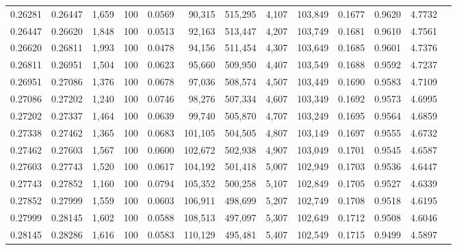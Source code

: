 \begin{tabular}{rrrrrrrrrrrrr}
0.26281 & 0.26447 & 1,659 & 100 &                                     0.0569 &  90,315 & 515,295 &   4,107 & 103,849 & 0.1677 & 0.9620 & 4.7732 \\
0.26447 & 0.26620 & 1,848 & 100 &                                     0.0513 &  92,163 & 513,447 &   4,207 & 103,749 & 0.1681 & 0.9610 & 4.7561 \\
0.26620 & 0.26811 & 1,993 & 100 &                                     0.0478 &  94,156 & 511,454 &   4,307 & 103,649 & 0.1685 & 0.9601 & 4.7376 \\
0.26811 & 0.26951 & 1,504 & 100 &                                     0.0623 &  95,660 & 509,950 &   4,407 & 103,549 & 0.1688 & 0.9592 & 4.7237 \\
0.26951 & 0.27086 & 1,376 & 100 &                                     0.0678 &  97,036 & 508,574 &   4,507 & 103,449 & 0.1690 & 0.9583 & 4.7109 \\
0.27086 & 0.27202 & 1,240 & 100 &                                     0.0746 &  98,276 & 507,334 &   4,607 & 103,349 & 0.1692 & 0.9573 & 4.6995 \\
0.27202 & 0.27337 & 1,464 & 100 &                                     0.0639 &  99,740 & 505,870 &   4,707 & 103,249 & 0.1695 & 0.9564 & 4.6859 \\
0.27338 & 0.27462 & 1,365 & 100 &                                     0.0683 & 101,105 & 504,505 &   4,807 & 103,149 & 0.1697 & 0.9555 & 4.6732 \\
0.27462 & 0.27603 & 1,567 & 100 &                                     0.0600 & 102,672 & 502,938 &   4,907 & 103,049 & 0.1701 & 0.9545 & 4.6587 \\
0.27603 & 0.27743 & 1,520 & 100 &                                     0.0617 & 104,192 & 501,418 &   5,007 & 102,949 & 0.1703 & 0.9536 & 4.6447 \\
0.27743 & 0.27852 & 1,160 & 100 &                                     0.0794 & 105,352 & 500,258 &   5,107 & 102,849 & 0.1705 & 0.9527 & 4.6339 \\
0.27852 & 0.27999 & 1,559 & 100 &                                     0.0603 & 106,911 & 498,699 &   5,207 & 102,749 & 0.1708 & 0.9518 & 4.6195 \\
0.27999 & 0.28145 & 1,602 & 100 &                                     0.0588 & 108,513 & 497,097 &   5,307 & 102,649 & 0.1712 & 0.9508 & 4.6046 \\
0.28145 & 0.28286 & 1,616 & 100 &                                     0.0583 & 110,129 & 495,481 &   5,407 & 102,549 & 0.1715 & 0.9499 & 4.5897 \\

\end{tabular}
